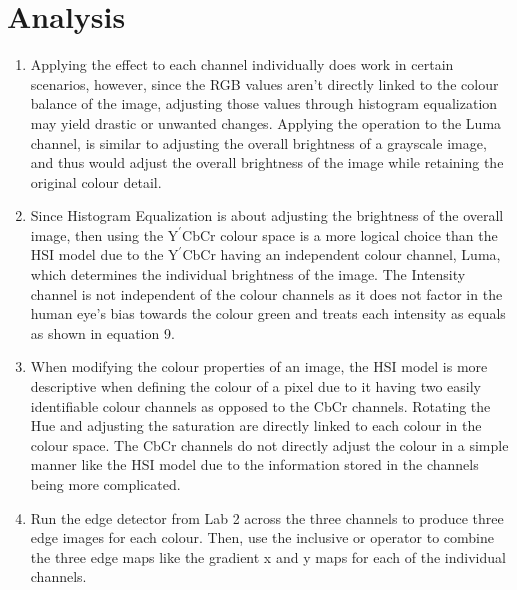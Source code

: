 \documentclass{article}
\begin{document}
	\section{Analysis}
	
	\begin{enumerate}
		\item Applying the effect to each channel individually does work in certain scenarios, however, since the RGB values aren't directly linked to the colour balance of the image, adjusting those values through histogram equalization may yield drastic or unwanted changes. Applying the operation to the Luma channel, is similar to adjusting the overall brightness of a grayscale image, and thus would adjust the overall brightness of the image while retaining the original colour detail.
		
		\item Since Histogram Equalization is about adjusting the brightness of the overall image, then using the $\textrm{Y}^\prime$CbCr colour space is a more logical choice than the HSI model due to the $\textrm{Y}^\prime$CbCr having an independent colour channel, Luma, which determines the individual brightness of the image. The Intensity channel is not independent of the colour channels as it does not factor in the human eye's bias towards the colour green and treats each intensity as equals as shown in equation 9.
		
		\item When modifying the colour properties of an image, the HSI model is more descriptive when defining the colour of a pixel due to it having two easily identifiable colour channels as opposed to the CbCr channels. Rotating the Hue and adjusting the saturation are directly linked to each colour in the colour space. The CbCr channels do not directly adjust the colour in a simple manner like the HSI model due to the information stored in the channels being more complicated.
		
		\item Run the edge detector from Lab 2 across the three channels to produce three edge images for each colour. Then, use the inclusive or operator to combine the three edge maps like the gradient x and y maps for each of the individual channels.
	\end{enumerate}
	
\end{document}
